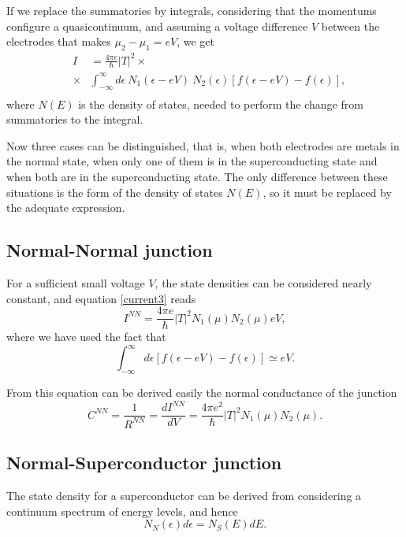 \documentclass[twocolumn, twoside,a4paper,10pt]{article}
\begin{document}
If we replace the summatories by integrals, considering that the momentums configure a quasicontinuum, and assuming a voltage difference $V$ between the electrodes that makes $\mu_2-\mu_1=eV$, we get
\begin{eqnarray}\label{current3}
&I& = \frac{4\pi e}{\hbar}  |T|^2 \times
	\nonumber \\
	&\times& \int_{-\infty}^{\infty} d\epsilon\ N_1(\epsilon-eV)\ N_2(\epsilon) [f(\epsilon-eV)-f(\epsilon)],
	\nonumber \\
\end{eqnarray}
where $N(E)$ is the density of states, needed to perform the change from summatories to the integral.

Now three cases can be distinguished, that is, when both electrodes are metals in the normal state, when only one of them is in the superconducting state and when both are in the superconducting state. The only difference between these situations is the form of the density of states $N(E)$, so it must be replaced by the adequate expression.

\subsection{Normal-Normal junction}
For a sufficient small voltage $V$, the state densities can be considered nearly constant, and equation \eqref{current3} reads
\begin{equation}\label{inn}
I^{NN} = \frac{4\pi e}{\hbar} |T|^2 N_1(\mu)N_2(\mu) eV,
\end{equation}
where we have used the fact that $$ \int_{-\infty}^{\infty}d\epsilon [f(\epsilon-eV)-f(\epsilon)] \simeq eV. $$

From this equation can be derived easily the normal conductance of the junction
\begin{equation}\label{cnn}
C^{NN} = \frac{1}{R^{NN}} = \frac{dI^{NN}}{dV} = \frac{4\pi e^2}{\hbar} |T|^2 N_1(\mu)N_2(\mu).
\end{equation}


\subsection{Normal-Superconductor junction} 
The state density for a superconductor can be derived from considering a continuum spectrum of energy levels, and hence
\begin{equation}
N_N(\epsilon) d\epsilon = N_S(E)dE.
\end{equation}
\end{document}
